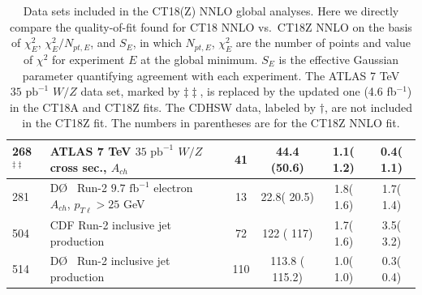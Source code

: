 \begin{widetext}
\begin{table}[htbp]
\begin{tabular}{|l|lr|c|c|c|c|}
 268$^{\ddagger\ddagger}$ & ATLAS 7 TeV $35\mbox{ pb}^{-1}$ $W/Z$ cross sec., $A_{ch}$                          & \cite{Aad:2011dm}           &   41  &    44.4   (50.6) &   1.1( 1.2) &   0.4(  1.1)   \tabularnewline\hline
 281 & D\O~ Run-2 $9.7 \mbox{ fb}^{-1}$ electron $A_{ch}$, $p_{T\ell}>25$ GeV              & \cite{D0:2014kma}           &   13  &    22.8(  20.5) &   1.8( 1.6) &   1.7(  1.4)   \tabularnewline\hline
 504 & CDF Run-2 inclusive jet production                                                  & \cite{Aaltonen:2008eq}      &   72  &   122 ( 117) &   1.7( 1.6) &   3.5(  3.2)   \tabularnewline\hline
 514 & D\O~ Run-2 inclusive jet production                                                 & \cite{Abazov:2008ae}        &  110  &   113.8 ( 115.2) &   1.0( 1.0) &   0.3(  0.4)   \tabularnewline
\hline
\hline
\end{tabular}
\caption{Data sets included in the CT18(Z) NNLO global analyses. Here we directly compare the quality-of-fit found for CT18 NNLO vs.~CT18Z NNLO on the basis of $\chi^2_E$,
	$\chi^2_E/N_{pt, E}$, and $S_E$, in which $N_{pt, E}$, $\chi^2_E$ are the number of points and value of $\chi^2$ for  experiment  $E$ at the global minimum. $S_E$ is
	the effective Gaussian parameter \cite{Lai:2010vv, Gao:2013xoa, Dulat:2013hea} quantifying agreement with each experiment. The ATLAS 7 TeV $35\mbox{ pb}^{-1}$ $W/Z$ data set, marked
	by $\ddagger\ddagger$, is replaced by the updated one (4.6 fb$^{-1}$) in the CT18A and CT18Z fits. The CDHSW data, labeled by $\dagger$, are not included in the CT18Z fit. The numbers in parentheses are for the CT18Z NNLO fit.
\label{tab:EXP_1} }
\end{table}
\endgroup
\end{widetext}

